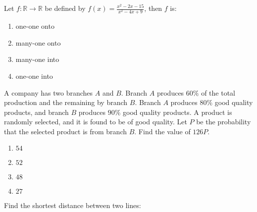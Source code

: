 \item Let $f : \mathbb{R} \to \mathbb{R}$ be defined by $f(x) = \frac{x^2 - 2x - 15}{x^2 - 4x + 9}$, then $f$ is:
    \begin{enumerate}
        \item one-one onto
        \item many-one onto
        \item many-one into
        \item one-one into
    \end{enumerate}
\item A company has two branches $A$ and $B$. Branch $A$ produces $60\%$ of the total production and the remaining by branch $B$. Branch $A$ produces $80\%$ good quality products, and branch $B$ produces $90\%$ good quality products. A product is randomly selected, and it is found to be of good quality. Let $P$ be the probability that the selected product is from branch $B$. Find the value of $126P$.
\begin{enumerate}
    \item $54$
    \item $52$
    \item $48$
    \item $27$
\end{enumerate}
\item Find the shortest distance between two lines:
